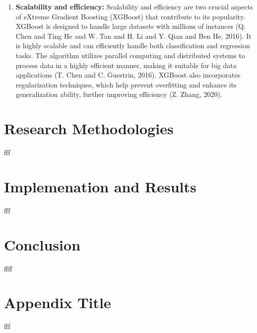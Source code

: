 \documentclass[12pt,oneside]{report}
\begin{document}
\begin{enumerate}
\item \textbf{Scalability and efficiency:}
Scalability and efficiency are two crucial aspects of eXtreme Gradient Boosting (XGBoost) that contribute to its popularity. XGBoost is designed to handle large datasets with millions of instances (Q. Chen and Ting He and W. Tan and H. Li and Y. Qian and Ben He, 2016). It is highly scalable and can efficiently handle both classification and regression tasks. The algorithm utilizes parallel computing and distributed systems to process data in a highly efficient manner, making it suitable for big data applications (T. Chen and C. Guestrin, 2016). XGBoost also incorporates regularization techniques, which help prevent overfitting and enhance its generalization ability, further improving efficiency (Z. Zhang, 2020).
\end{enumerate}



\chapter{Research Methodologies}
fff

\chapter{Implemenation and Results}
fff

\chapter{Conclusion}
ffff

\appendix
\chapter{Appendix Title}
fff
\end{document}
